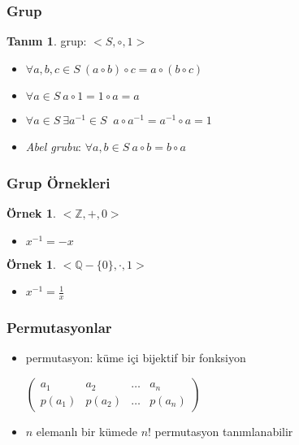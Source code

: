 \documentclass[dvipsnames]{beamer}
\theoremstyle{definition}
\newtheorem{tanim}[theorem]{Tanım}
\theoremstyle{example}
\newtheorem{ornek}[theorem]{Örnek}
\theoremstyle{plain}
\begin{document}
\begin{frame}
  \frametitle{Grup}

  \begin{tanim}
    \alert{grup}: $<S,\circ,1>$

    \begin{itemize}
      \item $\forall a,b,c \in S~(a \circ b) \circ c = a \circ (b \circ c)$
      \item $\forall a \in S~a \circ 1 = 1 \circ a = a$
      \item $\forall a \in S~\exists a^{-1} \in S~$
        $a \circ a^{-1} = a^{-1} \circ a = 1$

      \pause
      \medskip
      \item \emph{Abel grubu}: $\forall a,b \in S~a \circ b = b \circ a$
    \end{itemize}
  \end{tanim}
\end{frame}

\begin{frame}
  \frametitle{Grup Örnekleri}

  \begin{ornek}
    $<\mathbb{Z},+,0>$

    \begin{itemize}
      \item $x^{-1} = -x$
    \end{itemize}
  \end{ornek}

  \pause
  \begin{ornek}
    $<\mathbb{Q}-\{0\},\cdot,1>$

    \begin{itemize}
      \item $x^{-1} = \frac{1}{x}$
    \end{itemize}
  \end{ornek}
\end{frame}

\begin{frame}
  \frametitle{Permutasyonlar}

  \begin{itemize}
    \item permutasyon: küme içi bijektif bir fonksiyon

    \medskip
    $\left(
      \begin{array}{cccc}
         a_1   &  a_2   & \dots &  a_n\\
        p(a_1) & p(a_2) & \dots & p(a_n)
      \end{array}
    \right)$

    \medskip
    \item $n$ elemanlı bir kümede $n!$ permutasyon tanımlanabilir
  \end{itemize}
\end{frame}
\end{document}
